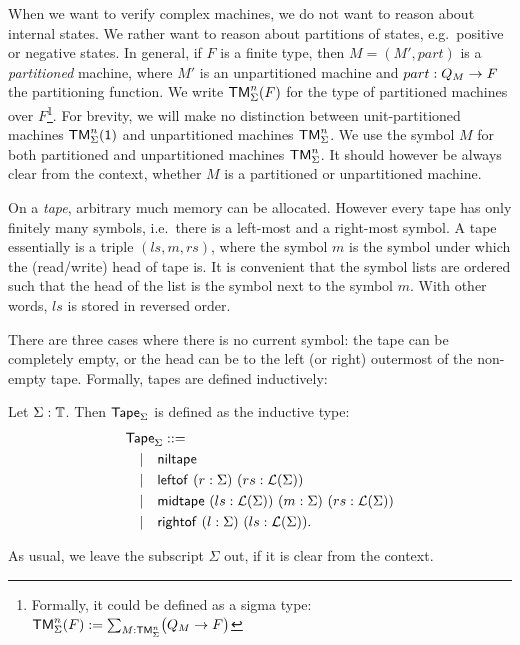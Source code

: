 When we want to verify complex machines, we do not want to reason about internal states.  We rather want to reason about partitions of states, e.g.\
positive or negative states.  In general, if $F$ is a finite type, then $M = (M', part)$ is a \emph{partitioned} machine, where $M'$ is an
unpartitioned machine and $part : Q_M \rightarrow F$ the partitioning function.  We write $\mathsf{TM}_\Sigma^n(F)$ for the type of partitioned machines over
$F$\footnote{Formally, it could be defined as a sigma type: $\mathsf{TM}_\Sigma^n(F) := \sum_{M:\mathsf{TM}_\Sigma^n}\bigl(Q_M \rightarrow F\bigr)$}.  For brevity, we
will make no distinction between unit-partitioned machines $\mathsf{TM}_\Sigma^n(\mathsf{1})$ and unpartitioned machines $\mathsf{TM}_\Sigma^n$.  We use the symbol $M$ for
both partitioned and unpartitioned machines $\mathsf{TM}_\Sigma^n$.  It should however be always clear from the context, whether $M$ is a partitioned or
unpartitioned machine.

On a \emph{tape}, arbitrary much memory can be allocated.  However every tape has only finitely many symbols, i.e.\ there is a left-most and a
right-most symbol.  A tape essentially is a triple $(ls,m,rs)$, where the symbol $m$ is the symbol under which the (read/write) head of tape is.  It
is convenient that the symbol lists are ordered such that the head of the list is the symbol next to the symbol $m$.  With other words, $ls$ is stored
in reversed order.

There are three cases where there is no current symbol: the tape can be completely empty, or the head can be to the left (or right) outermost of the
non-empty tape.  Formally, tapes are defined inductively:

\begin{definition}[Tape]
  \label{def:tape}
  Let $\Sigma : \mathbb{T}$.  Then $\mathsf{Tape}_\Sigma$ is defined as the inductive type:
  \begin{align*}
    & \mathsf{Tape}_\Sigma ::= \\
    & \quad | \quad \mathsf{niltape} \\
    & \quad | \quad \mathsf{leftof}  ~ (r:\Sigma) ~ (rs:\mathcal{L}(\Sigma)) \\
    & \quad | \quad \mathsf{midtape} ~ (ls:\mathcal{L}(\Sigma)) ~ (m:\Sigma) ~ (rs:\mathcal{L}(\Sigma)) \\
    & \quad | \quad \mathsf{rightof} ~ (l:\Sigma) ~ (ls:\mathcal{L}(\Sigma)).
  \end{align*}
\end{definition}

As usual, we leave the subscript $\Sigma$ out, if it is clear from the context.

